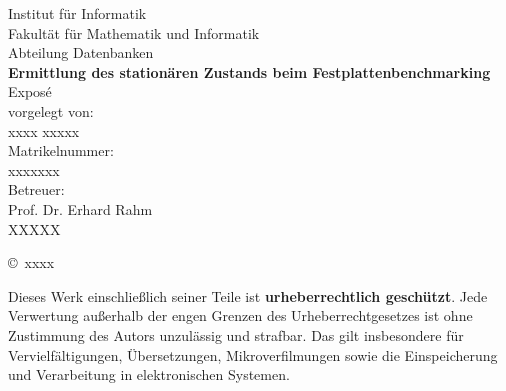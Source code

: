 \documentclass{article}
\newcommand{\titel}{Ermittlung des stationären Zustands beim Festplattenbenchmarking}
\newcommand{\art}{Exposé} %
\newcommand{\fachgebiet}{Abteilung Datenbanken}
\newcommand{\fakultaet}{Fakultät für Mathematik und Informatik}
\newcommand{\institut}{Institut für Informatik}
\newcommand{\autor}{xxxx xxxxx}
\newcommand{\matrikelnr}{xxxxxxx}
\newcommand{\erstbetreuer}{Prof. Dr. Erhard Rahm}
\newcommand{\zweitbetreuer}{XXXXX}
\newcommand{\jahr}{xxxx}
\begin{document}
\thispagestyle{plain}
\begin{titlepage}

\begin{center}

\institut\\
\fakultaet\\
\fachgebiet\\[6ex]

\textbf{\large\titel}\\[1.5ex]
\art\\[6ex]

\normalsize
vorgelegt von:\\
\autor\\[1.5ex]
Matrikelnummer:\\
\matrikelnr\\[1.5ex]
Betreuer:\\
\erstbetreuer\\
\zweitbetreuer\\[1.0ex]
\end{center}


\begin{center}
\copyright\ \jahr\\[1.0ex]
\end{center}

\singlespacing
\small
\noindent Dieses Werk einschließlich seiner Teile ist \textbf{urheberrechtlich geschützt}. Jede Verwertung außerhalb der engen Grenzen des Urheberrechtgesetzes ist ohne Zustimmung des Autors unzulässig und strafbar. Das gilt insbesondere für Vervielfältigungen, Übersetzungen, Mikroverfilmungen sowie die Einspeicherung und Verarbeitung in elektronischen Systemen.



\end{titlepage}


\tableofcontents{}


\newpage

\begin{abstract}
Mit Benchmarks kann man die Performanz von Computersystemen, wie etwa die Rechenleistung und die I/O-Geschwindigkeit messen. Diese Messungen können stark oder schwach schwanken, je nachdem, ob ein Warm-Up erfolgte. Für die Ermittlung des stationären Zustandes sind geringe Schwankungen bei den Messungen notwendig. In dieser Arbeit wird mit dem Benchmark-Tool Fio gearbeitet, und es wird ein Analysetool entwickelt, das diesen Zustand ermittelt. Dabei wird statistische Analyse angewendet, um diesen stationären Zustand zu bestimmen. Das Programm wird in Java geschrieben.

\end{abstract}
\end{document}
